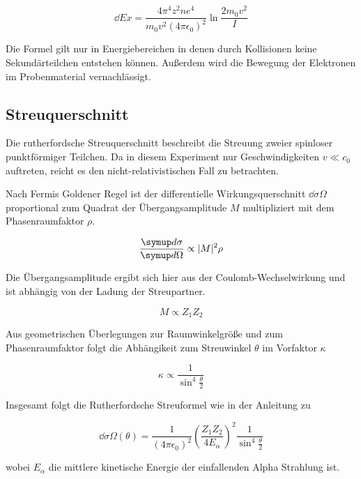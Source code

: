 \begin{equation}
  \label{eq:bethe}
  \dd{E}{x} = \frac{4 \pi^4 z^2 n e^4}{m_0 v^2 (4 \pi \epsilon_0)^2} \ln \frac{2 m_0 v^2}{I}
\end{equation}

Die Formel gilt nur in Energiebereichen in denen durch Kollisionen keine Sekundärteilchen entstehen können.
Außerdem wird die Bewegung der Elektronen im Probenmaterial vernachlässigt.


\subsection{Streuquerschnitt}
Die rutherfordsche Streuquerschnitt beschreibt die Streuung zweier spinloser punktförmiger Teilchen. Da in diesem Experiment nur Geschwindigkeiten
$v \ll c_0$ auftreten, reicht es den nicht-relativistischen Fall zu betrachten.

Nach Fermis Goldener Regel ist der differentielle Wirkungsquerschnitt $\dd{\sigma}{\Omega}$ proportional zum Quadrat der Übergangsamplitude $M$ multipliziert mit dem Phasenraumfaktor $\rho$.

\begin{equation}
  \dd{\sigma}{\Omega} \propto \abs{M}^2 \rho
\end{equation}

Die Übergangsamplitude ergibt sich hier aus der Coulomb-Wechselwirkung und ist abhängig von der Ladung der Streupartner.


\begin{equation}
  M \propto Z_1 Z_2
\end{equation}


Aus geometrischen Überlegungen zur Raumwinkelgröße und zum Phasenraumfaktor folgt die Abhängikeit zum Streuwinkel $\theta$ im Vorfaktor $\kappa$

\begin{equation}
  \kappa \propto \frac{1}{\sin^4{\frac{\theta}{2}}}
\end{equation}

Insgesamt folgt die Rutherfordsche Streuformel wie in der Anleitung zu

\begin{equation}
  \label{ruther}
  \dd{\sigma}{\Omega} (\theta) = \frac{1}{(4 \pi \epsilon_0)^2} \left( \frac{Z_1 Z_2}{4 E_{\alpha}} \right)^2 \frac{1}{\sin^4{\frac{\theta}{2}}}
\end{equation}

wobei $E_{\alpha}$ die mittlere kinetische Energie der einfallenden Alpha Strahlung ist.
